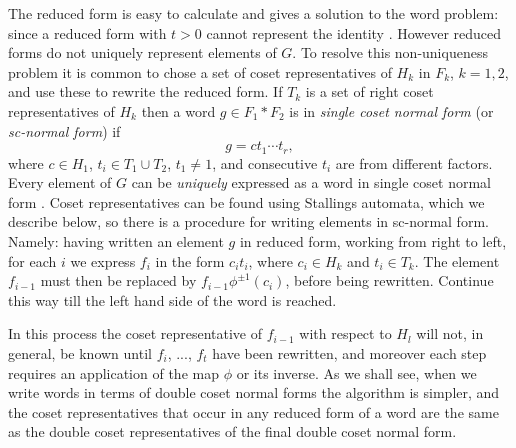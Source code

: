 \documentclass[a4paper,12pt]{article}
\numberwithin{equation}{section}
\numberwithin{figure}{section}
\begin{document}
The reduced form is easy to calculate and gives a solution to the word problem: since
a reduced form with $t>0$ cannot represent the identity \cite[Theorem 2.6]{LS}.
However reduced forms do not uniquely represent
 elements of $G$. To resolve this non-uniqueness problem it is common to
chose a set of coset representatives of $H_k$ in $F_k$, $k=1,2$, and use these to rewrite
the reduced form. If $T_k$ is a set of right coset representatives of $H_k$ then
 a word $g\in F_1\ast F_2$ is in \emph{single coset normal form} (or \emph{sc-normal form}) if
\[g=ct_1\cdots t_r,\]
where $c\in H_1$, $t_i\in T_1\cup T_2$, $t_1\neq 1$, and consecutive $t_i$ are from
different factors. Every element of $G$ can be \emph{uniquely} expressed as a word in single coset
normal form \cite[Theorem 4.4]{MKS}.
Coset representatives can be found using Stallings automata, which we describe below, so
there is a procedure for writing elements in sc-normal form. Namely:
having written an element $g$ in reduced form,
working from right to left, for each $i$
 we express $f_i$ in the
form $c_it_i$, where $c_i\in H_k$ and $t_i\in T_k$. The element $f_{i-1}$ must then be replaced
by $f_{i-1}\phi^{\pm 1}(c_i)$, before being rewritten. Continue this way till the
left hand side of the word is reached.

In this process the coset representative of
$f_{i-1}$ with respect to $H_l$ will not, in general, be known
 until $f_i$, ..., $f_t$ have been rewritten, and moreover each step requires an application
of the map $\phi$ or its inverse. As we shall see, when we write words in terms of
double
coset normal forms the algorithm is simpler, and the coset representatives that
occur in any reduced  form of a word are the same as
the double coset representatives of the final double coset normal form.
\end{document}
